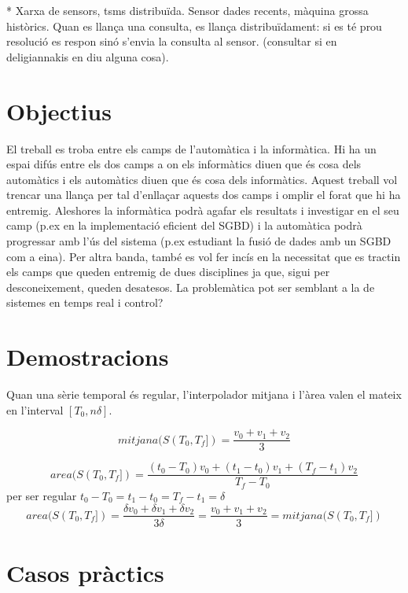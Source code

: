 * Xarxa de sensors, tsms distribuïda. Sensor dades recents, màquina grossa històrics. Quan es llança una consulta, es llança distribuïdament: si es té prou resolució es respon sinó s'envia la consulta al sensor. (consultar si en deligiannakis en diu alguna cosa).





\section{Objectius}

El treball es troba entre els camps de l'automàtica i la informàtica. Hi ha un espai difús entre els dos camps a on els informàtics diuen que és cosa dels automàtics i els automàtics diuen que és cosa dels informàtics.  Aquest treball vol trencar una llança per tal d'enllaçar aquests dos camps i omplir el forat que hi ha entremig. Aleshores la informàtica podrà agafar els resultats i investigar en el seu camp (p.ex en la implementació eficient del SGBD) i la automàtica podrà progressar amb l'ús del sistema (p.ex estudiant la fusió de dades amb un SGBD com a eina). Per altra banda, també es vol fer incís en la necessitat que es tractin els camps que queden entremig de dues disciplines ja que, sigui per desconeixement, queden desatesos.
La problemàtica pot ser semblant a la de sistemes en temps real i control?




\section{Demostracions}


Quan una sèrie temporal és regular, l'interpolador mitjana i l'àrea valen el mateix en l'interval $[T_0,n\delta]$.

\[
mitjana(S(T_0,T_f] ) = \frac{v_0+v_1+v_2}{3}
\]

\[
area(S(T_0,T_f] ) = \frac{(t_0-T_0)v_0+(t_1-t_0)v_1+(T_f-t_1)v_2}{T_f-T_0} 
\]
per ser regular $t_0 -T_0 = t_1 -t_0 = T_f - t_1 = \delta$
\[
area(S(T_0,T_f] ) = \frac{\delta v_0 + \delta v_1 + \delta v_2}{3\delta}
=\frac{v_0+v_1+v_2}{3} = mitjana(S(T_0,T_f] )
\]




\section{Casos pràctics}


